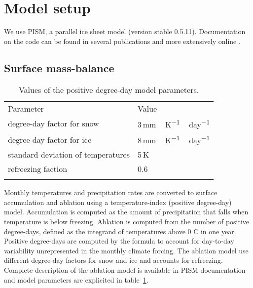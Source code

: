 
\section{Model setup}
\label{sec:setup}

We use PISM, a parallel ice sheet model (version stable 0.5.11). Documentation on the code can be found in several publications \citep[e.g.,][]{bueler-brown-2009,winkelmann-etal-2011,aschwanden-etal-2012} and more extensively online \citep[{\url{http://www.pism-docs.org}},][]{web:pism}.

\subsection{Surface mass-balance}

\begin{table}[t]
	\caption{Values of the positive degree-day model parameters.}
	\label{tab:pdd}
	\vskip4mm
	\centering
	\begin{tabular}{ll}
		\tophline
		Parameter& Value\\
		\middlehline
		degree-day factor for snow & 3\,\unit{mm\,K^{-1}\,day^{-1}}\\
		degree-day factor for ice & 8\,\unit{mm\,K^{-1}\,day^{-1}}\\
		standard deviation of temperatures & 5\,K\\
		refreezing faction & 0.6 \\
		\bottomhline
	\end{tabular}
\end{table}

Monthly temperatures and precipitation rates are converted to surface accumulation and ablation using a temperature-index (positive degree-day) model. Accumulation is computed as the amount of precipitation that falls when temperature is below freezing. Ablation is computed from the number of positive degree-days, defined as the integrand of temperatures above 0\,\degree\,C in one year. Positive degree-days are computed by the \citet{calov-greve-2011} formula to account for day-to-day variability unrepresented in the monthly climate forcing. The ablation model use different degree-day factors for snow and ice and accounts for refreezing. Complete description of the ablation model is available in PISM documentation \citep[{\url{http://www.pism-docs.org}},][]{web:pism} and model parameters are explicited in table~\ref{tab:pdd}.

